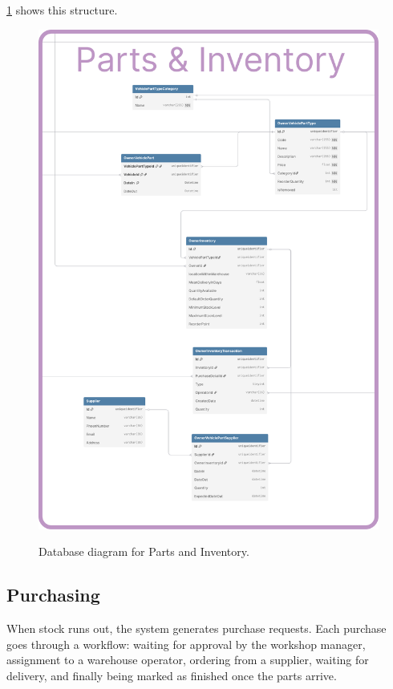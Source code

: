 \ref{fig:dbParts} shows this structure.

\begin{figure}[h]
  \caption{Database diagram for Parts and Inventory.}
  \centering
  \includegraphics[width=\textwidth]{figs/dbDiagrams/Parts_and_Inventory}
  \label{fig:dbParts}
\end{figure}


\subsection{Purchasing} 


When stock runs out, the system generates purchase requests. Each purchase goes through a workflow: waiting for approval by the workshop manager, assignment to a warehouse operator, ordering from a supplier, waiting for delivery, and finally being marked as finished once the parts arrive.

